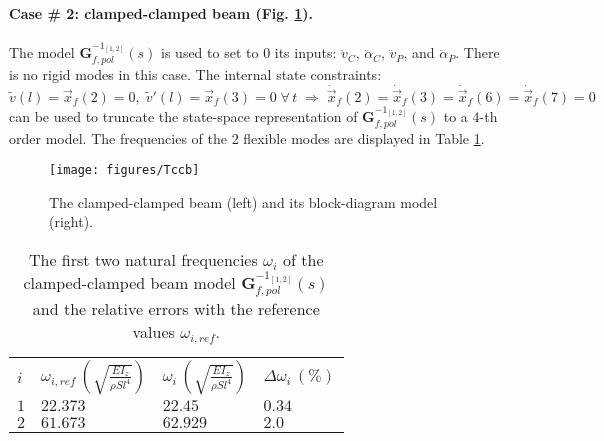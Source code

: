 \paragraph{Case \# 2: clamped-clamped beam (Fig. \ref{fig:Tcc}).} The model $\mathbf{G}_{f,pol}^{-1_{[1,2]}}(s)$ is used to set to $0$ its inputs: $\ddot{v}_C$, $\ddot{\alpha}_C$, $\ddot{v}_P$, and $\ddot{\alpha}_P$. There is no rigid modes in this case. The internal state constraints:
\[
\widetilde{v}(l)=\vec{x}_f(2)=0,\;\widetilde{v}'(l)=\vec{x}_f(3)=0\;\forall\,t\;\Rightarrow\;\dot{\vec{x}}_f(2)=\dot{\vec{x}}_f(3)=\dot{\vec{x}}_f(6)=\dot{\vec{x}}_f(7)=0
\]
can be used to truncate the state-space representation of $\mathbf{G}_{f,pol}^{-1_{[1,2]}}(s)$ to a $4$-th order model. The frequencies of the 2 flexible modes are displayed in Table \ref{tab:Tcc}.
\begin{figure}[htbp!]
  \texttt{[image: figures/Tccb]}
\caption{The clamped-clamped beam (left) and its block-diagram model (right).}
\label{fig:Tcc} 
\end{figure}
\begin{table}[htbp!]
\caption{The first two natural frequencies $\omega_i$ of the clamped-clamped beam model $\mathbf{G}_{f,pol}^{-1_{[1,2]}}(s)$ and the relative errors with the reference values $\omega_{i,ref}$.}
\label{tab:Tcc}       %
\begin{tabular}{llll}
\hline\noalign{\smallskip}
  $i$ & $\omega_{i,ref}\,\left(\sqrt{\frac{EI_z}{\rho S l^4}}\right)$ &  $\omega_i\,\left(\sqrt{\frac{EI_z}{\rho S l^4}}\right)$ &  $\Delta \omega_i\,(\%)$ \\
\noalign{\smallskip}\hline\noalign{\smallskip}
$1$ & $22.373$ & $22.45$  & $0.34$ \\ 
$2$ & $61.673$ & $62.929$ & $2.0$ \\
\hline
\end{tabular}
\end{table}

\FloatBarrier
